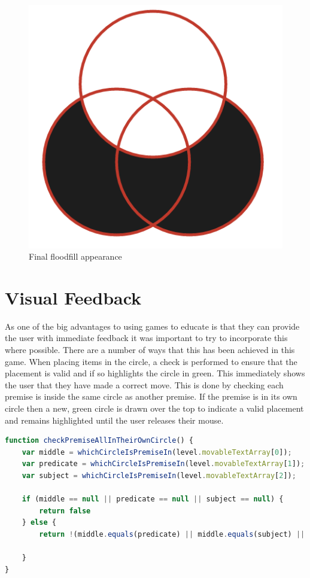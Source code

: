 \documentclass[12pt,a4paper]{report}
\begin{document}
	\begin{figure}[h]
\centering
    \includegraphics[scale=0.4]{floodFillGood}
    \caption{Final floodfill appearance}
    \label{fig:floodFillGood}
\end{figure}
\FloatBarrier
	
	\section{Visual Feedback}
As one of the big advantages to using games to educate is that they can provide the user with immediate feedback it was important to try to incorporate this where possible. There are a number of ways that this has been achieved in this game. When placing items in the circle, a check is performed to ensure that the placement is valid and if so highlights the circle in green. This immediately shows the user that they have made a correct move.  This is done by checking each premise is inside the same circle as another premise. If the premise is in its own circle then a new, green circle is drawn over the top to indicate a valid placement and remains highlighted until the user releases their mouse.

\begin{minipage}{\linewidth}
\begin{lstlisting}[language=JavaScript]
function checkPremiseAllInTheirOwnCircle() {
    var middle = whichCircleIsPremiseIn(level.movableTextArray[0]);
    var predicate = whichCircleIsPremiseIn(level.movableTextArray[1]);
    var subject = whichCircleIsPremiseIn(level.movableTextArray[2]);

    if (middle == null || predicate == null || subject == null) {
        return false
    } else {
        return !(middle.equals(predicate) || middle.equals(subject) || predicate.equals(subject));

    }
}
\end{lstlisting}
\end{minipage}
\end{document}
